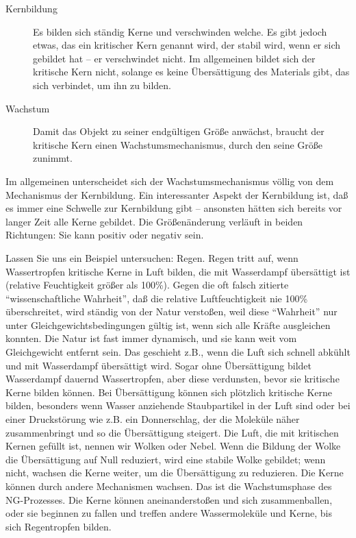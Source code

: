 \begin{description}
\item[Kernbildung] Es bilden sich ständig Kerne und verschwinden welche.
Es gibt jedoch etwas, das ein kritischer Kern genannt wird, der stabil wird, wenn er sich gebildet hat -- er verschwindet nicht.
Im allgemeinen bildet sich der kritische Kern nicht, solange es keine Übersättigung des Materials gibt, das sich verbindet, um ihn zu bilden.

\item[Wachstum] Damit das Objekt zu seiner endgültigen Größe anwächst, braucht der kritische Kern einen Wachstumsmechanismus, durch den seine Größe zunimmt.
\end{description}

Im allgemeinen unterscheidet sich der Wachstumsmechanismus völlig von dem Mechanismus der Kernbildung.
Ein interessanter Aspekt der Kernbildung ist, daß es immer eine Schwelle zur Kernbildung gibt -- ansonsten hätten sich bereits vor langer Zeit alle Kerne gebildet.
Die Größenänderung verläuft in beiden Richtungen: Sie kann positiv oder negativ sein.

Lassen Sie uns ein Beispiel untersuchen: Regen.
Regen tritt auf, wenn Wassertropfen kritische Kerne in Luft bilden, die mit Wasserdampf übersättigt ist (relative Feuchtigkeit größer als 100\%).
Gegen die oft falsch zitierte \enquote{wissenschaftliche Wahrheit}, daß die relative Luftfeuchtigkeit nie 100\% überschreitet, wird ständig von der Natur verstoßen, weil diese \enquote{Wahrheit} nur unter Gleichgewichtsbedingungen gültig ist, wenn sich alle Kräfte ausgleichen konnten.
Die Natur ist fast immer dynamisch, und sie kann weit vom Gleichgewicht entfernt sein.
Das geschieht z.B., wenn die Luft sich schnell abkühlt und mit Wasserdampf übersättigt wird.
Sogar ohne Übersättigung bildet Wasserdampf dauernd Wassertropfen, aber diese verdunsten, bevor sie kritische Kerne bilden können.
Bei Übersättigung können sich plötzlich kritische Kerne bilden, besonders wenn Wasser anziehende Staubpartikel in der Luft sind oder bei einer Druckstörung wie z.B. ein Donnerschlag, der die Moleküle näher zusammenbringt und so die Übersättigung steigert.
Die Luft, die mit kritischen Kernen gefüllt ist, nennen wir Wolken oder Nebel.
Wenn die Bildung der Wolke die Übersättigung auf Null reduziert, wird eine stabile Wolke gebildet; wenn nicht, wachsen die Kerne weiter, um die Übersättigung zu reduzieren.
Die Kerne können durch andere Mechanismen wachsen.
Das ist die Wachstumsphase des NG-Prozesses.
Die Kerne können aneinanderstoßen und sich zusammenballen, oder sie beginnen zu fallen und treffen andere Wassermoleküle und Kerne, bis sich Regentropfen bilden.

